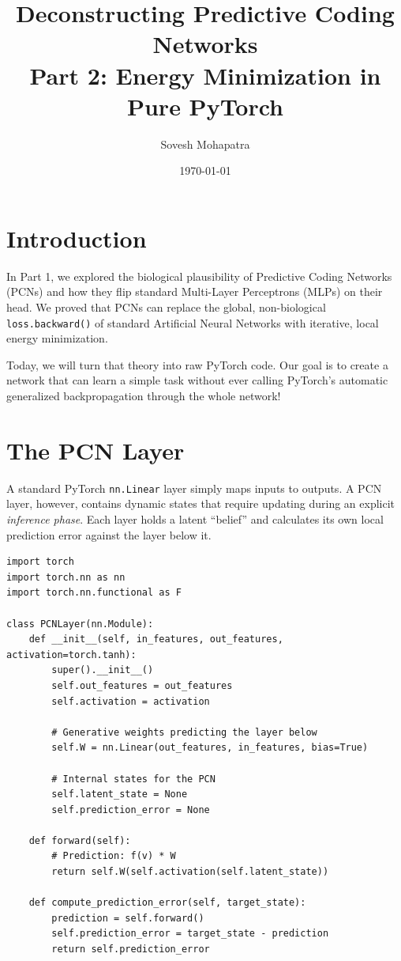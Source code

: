 \documentclass[12pt]{article}
\title{\textbf{Deconstructing Predictive Coding Networks \\ Part 2: Energy Minimization in Pure PyTorch}}
\author{Sovesh Mohapatra}
\date{\today}
\begin{document}
\maketitle

\section*{Introduction}
In Part 1, we explored the biological plausibility of Predictive Coding Networks (PCNs) and how they flip standard Multi-Layer Perceptrons (MLPs) on their head. We proved that PCNs can replace the global, non-biological \texttt{loss.backward()} of standard Artificial Neural Networks with iterative, local energy minimization.

Today, we will turn that theory into raw PyTorch code. Our goal is to create a network that can learn a simple task without ever calling PyTorch's automatic generalized backpropagation through the whole network!

\section*{The PCN Layer}

A standard PyTorch \texttt{nn.Linear} layer simply maps inputs to outputs. A PCN layer, however, contains dynamic states that require updating during an explicit \textit{inference phase}. Each layer holds a latent ``belief'' and calculates its own local prediction error against the layer below it.

\begin{verbatim}
import torch
import torch.nn as nn
import torch.nn.functional as F

class PCNLayer(nn.Module):
    def __init__(self, in_features, out_features, activation=torch.tanh):
        super().__init__()
        self.out_features = out_features
        self.activation = activation
        
        # Generative weights predicting the layer below
        self.W = nn.Linear(out_features, in_features, bias=True)
        
        # Internal states for the PCN
        self.latent_state = None
        self.prediction_error = None
        
    def forward(self):
        # Prediction: f(v) * W
        return self.W(self.activation(self.latent_state))
        
    def compute_prediction_error(self, target_state):
        prediction = self.forward()
        self.prediction_error = target_state - prediction
        return self.prediction_error
\end{verbatim}
\end{document}
